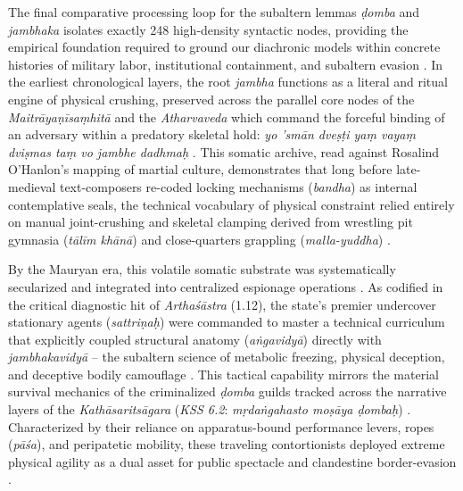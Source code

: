 \documentclass[11pt,twoside,letterpaper]{article}
\begin{document}
The final comparative processing loop for the subaltern lemmas \textit{ḍomba} and \textit{jambhaka} isolates exactly 248 high-density syntactic nodes, providing the empirical foundation required to ground our diachronic models within concrete histories of military labor, institutional containment, and subaltern evasion \cite{Lorenzen1978, McCartney2026c}. In the earliest chronological layers, the root \textit{jambha} functions as a literal and ritual engine of physical crushing, preserved across the parallel core nodes of the \textit{Maitrāyaṇīsaṃhitā} and the \textit{Atharvaveda} which command the forceful binding of an adversary within a predatory skeletal hold: \textit{yo 'smān dveṣṭi yaṃ vayaṃ dviṣmas taṃ vo jambhe dadhmaḥ} \cite{McCartney2026c}. This somatic archive, read against Rosalind O'Hanlon's mapping of martial culture, demonstrates that long before late-medieval text-composers re-coded locking mechanisms (\textit{bandha}) as internal contemplative seals, the technical vocabulary of physical constraint relied entirely on manual joint-crushing and skeletal clamping derived from wrestling pit gymnasia (\textit{tālīm khānā}) and close-quarters grappling (\textit{malla-yuddha}) \cite{Birch2024, OHanlon2007}.

By the Mauryan era, this volatile somatic substrate was systematically secularized and integrated into centralized espionage operations \cite{McCartney2026b}. As codified in the critical diagnostic hit of \textit{Arthaśāstra} (1.12), the state's premier undercover stationary agents (\textit{sattriṇaḥ}) were commanded to master a technical curriculum that explicitly coupled structural anatomy (\textit{aṅgavidyā}) directly with \textit{jambhakavidyā} -- the subaltern science of metabolic freezing, physical deception, and deceptive bodily camouflage \cite{McCartney2026b}. This tactical capability mirrors the material survival mechanics of the criminalized \textit{ḍomba} guilds tracked across the narrative layers of the \textit{Kathāsaritsāgara} (\textit{KSS 6.2}: \textit{mṛdaṅgahasto moṣāya ḍombaḥ}) \cite{McCartney2026c}. Characterized by their reliance on apparatus-bound performance levers, ropes (\textit{pāśa}), and peripatetic mobility, these traveling contortionists deployed extreme physical agility as a dual asset for public spectacle and clandestine border-evasion \cite{McCartney2026c, McCartney2026b}. 
\end{document}
